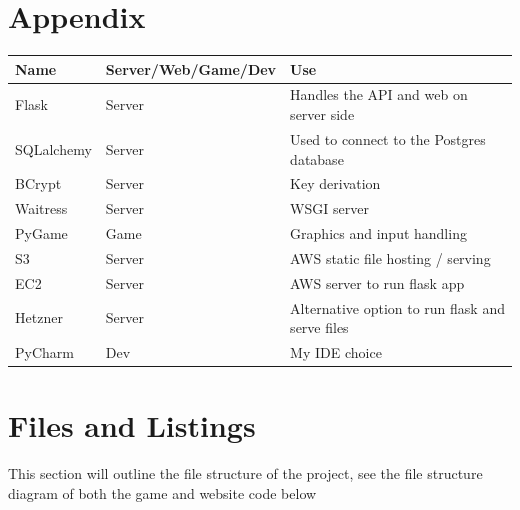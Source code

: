 \documentclass[a4paper, 11pt]{report}
\begin{document}
\section{Appendix}
\begin{table}[h!]
\begin{tabular}{|l|l|l|}
\hline
\rowcolor[HTML]{C0C0C0} 
{\color[HTML]{000000} \textbf{Name}} & {\color[HTML]{000000} \textbf{Server/Web/Game/Dev}} & {\color[HTML]{000000} \textbf{Use}}             \\ \hline
Flask                                & Server                                              & Handles the API and web on server side          \\ \hline
SQLalchemy                           & Server                                              & Used to connect to the Postgres database        \\ \hline
BCrypt                               & Server                                              & Key derivation                                  \\ \hline
Waitress                             & Server                                              & WSGI server                                     \\ \hline
PyGame                               & Game                                                & Graphics and input handling                     \\ \hline
S3                                   & Server                                              & AWS static file hosting / serving               \\ \hline
EC2                                  & Server                                              & AWS server to run flask app                     \\ \hline
Hetzner                              & Server                                              & Alternative option to run flask and serve files \\ \hline
PyCharm                              & Dev                                                 & My IDE choice                                   \\ \hline
\end{tabular}
\end{table}
\section{Files and Listings}
This section will outline the file structure of the project, see the file structure diagram of both the game and website code below
\end{document}
